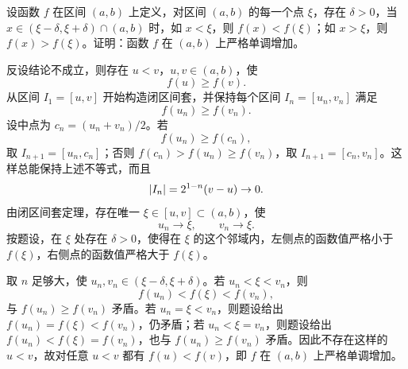 \begin{xreferenceproblem}[4]
设函数 $f$ 在区间 $(a,b)$ 上定义，对区间 $(a,b)$ 的每一个点 $\xi$，存在 $\delta>0$，当 $x\in(\xi-\delta,\xi+\delta)\cap(a,b)$ 时，如 $x<\xi$，则 $f(x)<f(\xi)$；如 $x>\xi$，则 $f(x)>f(\xi)$。证明：函数 $f$ 在 $(a,b)$ 上严格单调增加。
\end{xreferenceproblem}
\begin{xsolution}
反设结论不成立，则存在 $u<v$，$u,v\in(a,b)$，使
\[
  f(u)\geqslant f(v).
\]
从区间 $I_1=[u,v]$ 开始构造闭区间套，并保持每个区间 $I_n=[u_n,v_n]$ 满足
\[
  f(u_n)\geqslant f(v_n).
\]
设中点为 $c_n=(u_n+v_n)/2$。若
\[
  f(u_n)\geqslant f(c_n),
\]
取 $I_{n+1}=[u_n,c_n]$；否则 $f(c_n)>f(u_n)\geqslant f(v_n)$，取 $I_{n+1}=[c_n,v_n]$。这样总能保持上述不等式，而且
\[
  \lvert I_n\rvert=2^{1-n}(v-u)\to0.
\]
由闭区间套定理，存在唯一 $\xi\in[u,v]\subset(a,b)$，使
\[
  u_n\to\xi,\qquad v_n\to\xi.
\]
按题设，在 $\xi$ 处存在 $\delta>0$，使得在 $\xi$ 的这个邻域内，左侧点的函数值严格小于 $f(\xi)$，右侧点的函数值严格大于 $f(\xi)$。

取 $n$ 足够大，使 $u_n,v_n\in(\xi-\delta,\xi+\delta)$。若 $u_n<\xi<v_n$，则
\[
  f(u_n)<f(\xi)<f(v_n),
\]
与 $f(u_n)\geqslant f(v_n)$ 矛盾。若 $u_n=\xi<v_n$，则题设给出 $f(u_n)=f(\xi)<f(v_n)$，仍矛盾；若 $u_n<\xi=v_n$，则题设给出 $f(u_n)<f(\xi)=f(v_n)$，也与 $f(u_n)\geqslant f(v_n)$ 矛盾。因此不存在这样的 $u<v$，故对任意 $u<v$ 都有 $f(u)<f(v)$，即 $f$ 在 $(a,b)$ 上严格单调增加。
\end{xsolution}


